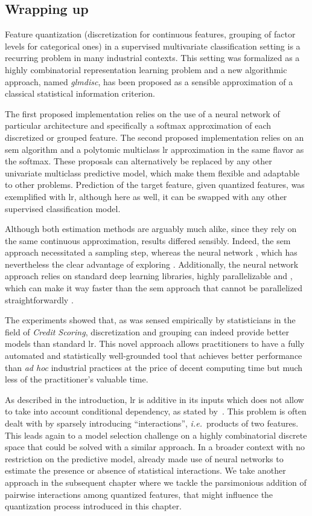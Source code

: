 \subsection{Wrapping up}

Feature quantization (discretization for continuous features, grouping of factor levels for categorical ones) in a supervised multivariate classification setting is a recurring problem in many industrial contexts. This setting was formalized as a highly combinatorial representation learning problem and a new algorithmic approach, named \textit{glmdisc}, has been proposed as a sensible approximation of a classical statistical information criterion.

The first proposed implementation relies on the use of a neural network of particular architecture and specifically a softmax approximation of each discretized or grouped feature. The second proposed implementation relies on an \gls{sem} algorithm and a polytomic multiclass \gls{lr} approximation in the same flavor as the softmax. These proposals can alternatively be replaced by any other univariate multiclass predictive model, which make them flexible and adaptable to other problems. Prediction of the target feature, given quantized features, was exemplified with \gls{lr}, although here as well, it can be swapped with any other supervised classification model.

Although both estimation methods are arguably much alike, since they rely on the same continuous approximation, results differed sensibly. Indeed, the \gls{sem} approach necessitated a sampling step, whereas the neural network , which has nevertheless the clear advantage of exploring . Additionally, the neural network approach relies on standard deep learning libraries, highly parallelizable and , which can make it way faster than the \gls{sem} approach that cannot be parallelized straightforwardly .

The experiments showed that, as was sensed empirically by statisticians in the field of \textit{Credit Scoring}, discretization and grouping can indeed provide better models than standard \gls{lr}. This novel approach allows practitioners to have a fully automated and statistically well-grounded tool that achieves better performance than \textit{ad hoc} industrial practices at the price of decent computing time but much less of the practitioner's valuable time.

As described in the introduction, \gls{lr} is additive in its inputs which does not allow to take into account conditional dependency, as stated by~\cite{berry2010testing}. This problem is often dealt with by sparsely introducing ``interactions'', \textit{i.e.}\ products of two features. This leads again to a model selection challenge on a highly combinatorial discrete space that could be solved with a similar approach. In a broader context with no restriction on the predictive model, \cite{tsang2018detecting} already made use of neural networks to estimate the presence or absence of statistical interactions. We take another approach in the subsequent chapter where we tackle the parsimonious addition of pairwise interactions among quantized features, that might influence the quantization process introduced in this chapter.

\printbibliography[heading=subbibliography, title=References of Chapter 3]